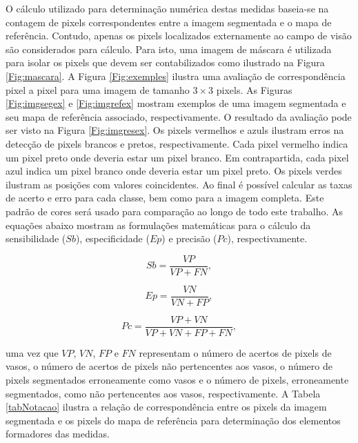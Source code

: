 O c\'{a}lculo utilizado para determina\c{c}\~{a}o num\'{e}rica destas medidas baseia-se na contagem de pixels correspondentes entre a imagem segmentada e o mapa de refer\^{e}ncia. Contudo, apenas os pixels localizados externamente ao campo de vis\~{a}o s\~{a}o considerados para c\'{a}lculo. Para isto, uma imagem de m\'{a}scara \'{e} utilizada para isolar os pixels que devem ser contabilizados como ilustrado na Figura \ref{Fig:mascara}. A Figura \ref{Fig:exemples} ilustra uma avalia\c{c}\~{a}o de correspond\^{e}ncia pixel a pixel para uma imagem de tamanho $3\times3$ pixels. As Figuras \ref{Fig:imgsegex} e \ref{Fig:imgrefex} mostram exemplos de uma imagem segmentada e seu mapa de refer\^{e}ncia associado, respectivamente. O resultado da avalia\c{c}\~{a}o pode ser visto na Figura \ref{Fig:imgresex}. Os pixels vermelhos e azuls ilustram erros na detec\c{c}\~{a}o  de pixels brancos e pretos, respectivamente. Cada pixel vermelho indica um pixel preto onde deveria estar um pixel branco. Em contrapartida, cada pixel azul indica um pixel branco onde deveria estar um pixel preto. Os pixels verdes ilustram as posi\c{c}\~{o}es com valores coincidentes. Ao final \'{e} poss\'{i}vel calcular as taxas de acerto e erro para cada classe, bem como para a imagem completa. Este padr\~{a}o de cores ser\'{a} usado para compara\c{c}\~{a}o ao longo de todo este trabalho. As equa\c{c}\~{o}es abaixo mostram as formula\c{c}\~{o}es matem\'{a}ticas para o c\'{a}lculo da sensibilidade ($Sb$), especificidade ($Ep$) e precis\~{a}o ($Pc$), respectivamente.

\begin{equation}
Sb = \frac{VP}{VP + FN},
\end{equation}

\begin{equation}
Ep = \frac{VN}{VN + FP},
\end{equation}

\begin{equation}\label{eq:acuracia}
Pc = \frac{VP + VN}{VP + VN + FP + FN},
\end{equation}

\noindent uma vez que $VP$, $VN$, $FP$ e $FN$ representam o n\'{u}mero de acertos de pixels de vasos, o n\'{u}mero de acertos de pixels n\~{a}o pertencentes aos vasos, o n\'{u}mero de pixels segmentados erroneamente como vasos e o n\'{u}mero de pixels, erroneamente segmentados, como n\~{a}o pertencentes aos vasos, respectivamente. A Tabela \ref{tabNotacao} ilustra a rela\c{c}\~{a}o de correspond\^{e}ncia entre os pixels da imagem segmentada e os pixels do mapa de refer\^{e}ncia para determina\c{c}\~{a}o dos elementos formadores das medidas.

